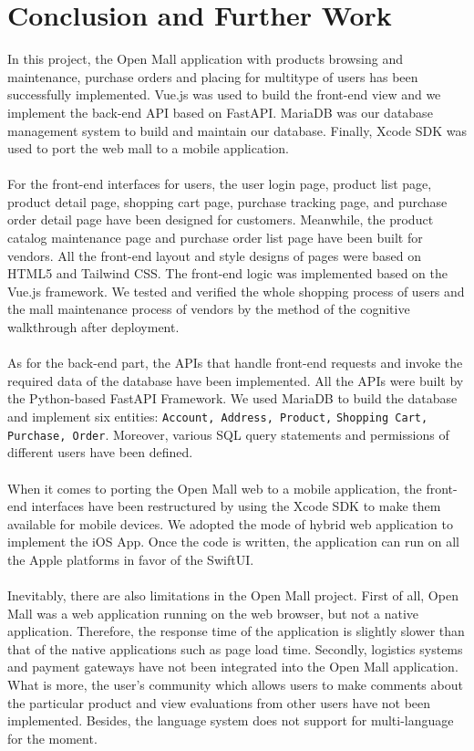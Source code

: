 \documentclass{article}
\begin{document}
\clearpage

\section{Conclusion and Further Work}
In this project, the Open Mall application with products browsing and maintenance, purchase orders and placing for multitype of users has been successfully implemented. Vue.js was used to build the front-end view and we implement the back-end API based on FastAPI. MariaDB was our database management system to build and maintain our database. Finally, Xcode SDK was used to port the web mall to a mobile application.
\\\\
For the front-end interfaces for users, the user login page,  product list page, product detail page, shopping cart page, purchase tracking page, and purchase order detail page have been designed for customers. Meanwhile, the product catalog maintenance page and purchase order list page have been built for vendors. All the front-end layout and style designs of pages were based on HTML5 and Tailwind CSS. The front-end logic was implemented based on the Vue.js framework. We tested and verified the whole shopping process of users and the mall maintenance process of vendors by the method of the cognitive walkthrough after deployment.
\\\\
As for the back-end part, the APIs that handle front-end requests and invoke the required data of the database have been implemented. All the APIs were built by the Python-based FastAPI Framework. We used MariaDB to build the database and implement six entities: \verb|Account, Address, Product,| \verb|Shopping Cart, Purchase, Order|. Moreover, various SQL query statements and permissions of different users have been defined.
\\\\
When it comes to porting the Open Mall web to a mobile application, the front-end interfaces have been restructured by using the Xcode SDK to make them available for mobile devices. We adopted the mode of hybrid web application to implement the iOS App. Once the code is written, the application can run on all the Apple platforms in favor of the SwiftUI. 
\\\\
Inevitably, there are also limitations in the Open Mall project. First of all, Open Mall was a web application running on the web browser, but not a native application. Therefore, the response time of the application is slightly slower than that of the native applications such as page load time. Secondly, logistics systems and payment gateways have not been integrated into the Open Mall application. What is more, the user’s community which allows users to make comments about the particular product and view evaluations from other users have not been implemented. Besides, the language system does not support for multi-language for the moment. 
\end{document}
